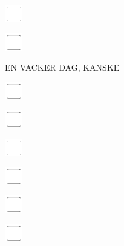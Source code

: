 \documentclass[11pt,titlepage]{article}
\begin{document}
\vspace{10mm}

\noindent
\includegraphics[]{checkbox-4mm.pdf}

\vspace{10mm}

\noindent
\includegraphics[]{checkbox-4mm.pdf}

\pagebreak

\small
\hfill EN VACKER DAG, KANSKE

\vspace{6mm}

\noindent
\includegraphics[]{checkbox-4mm.pdf}

\vspace{10mm}

\noindent
\includegraphics[]{checkbox-4mm.pdf}

\vspace{10mm}

\noindent
\includegraphics[]{checkbox-4mm.pdf}

\vspace{10mm}

\noindent
\includegraphics[]{checkbox-4mm.pdf}

\vspace{10mm}

\noindent
\includegraphics[]{checkbox-4mm.pdf}

\vspace{10mm}

\noindent
\includegraphics[]{checkbox-4mm.pdf}
\end{document}
